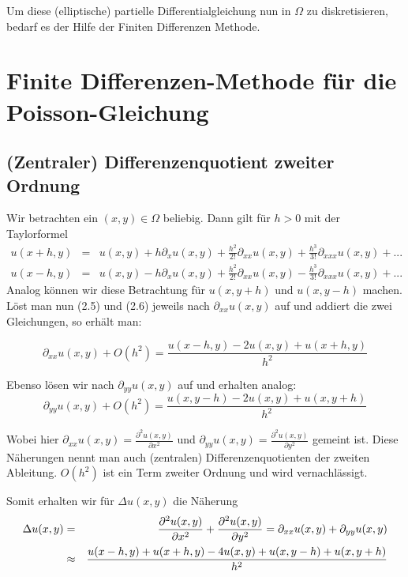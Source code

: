 Um diese (elliptische) partielle Differentialgleichung nun in $\Omega$ zu diskretisieren, bedarf es der Hilfe der Finiten Differenzen Methode.

\section{Finite Differenzen-Methode für die Poisson-Gleichung}\label{s.Finite Differenzen}

\subsection{(Zentraler) Differenzenquotient zweiter Ordnung}\label{ss.Differenzenquotient zweiter Ordnung}

Wir betrachten ein $(x,y) \in \Omega$ beliebig. Dann gilt für $h > 0$ mit der Taylorformel
\begin{eqnarray}
u(x+h,y) &=& u(x,y) + h \partial_{x} u(x,y) + \frac {h^{2}} {2!} \partial_{xx} u(x,y) + \frac {h^{3}} {3!} \partial_{xxx} u(x,y) + ... \\
u(x-h,y) &=& u(x,y) - h \partial_{x} u(x,y) + \frac {h^{2}} {2!} \partial_{xx} u(x,y) - \frac {h^{3}} {3!} \partial_{xxx} u(x,y) + ...
\end{eqnarray}
Analog können wir diese Betrachtung für $u(x,y+h)$ und $u(x,y-h)$ machen. \\
Löst man nun (2.5) und (2.6) jeweils nach $\partial_{xx} u(x,y)$ auf und addiert die zwei Gleichungen, so erhält man:

\begin{equation}
\partial_{xx} u(x,y) + O(h^{2}) = \frac {u(x-h,y) - 2u(x,y) + u(x+h,y)} {h^{2}}
\end{equation}

Ebenso lösen wir nach $\partial_{yy} u(x,y)$ auf und erhalten analog:
\begin{equation}
\partial_{yy} u(x,y) + O(h^{2}) = \frac {u(x,y-h) - 2u(x,y) + u(x,y+h)} {h^{2}}
\end{equation}

Wobei hier $\partial_{xx} u(x,y) = \frac {\partial^{2} u(x,y)} {\partial x^{2}}$ und $\partial_{yy} u(x,y) = \frac {\partial^{2} u(x,y)} {\partial y^{2}}$ gemeint ist.
Diese Näherungen nennt man auch (zentralen) Differenzenquotienten der zweiten Ableitung. $O(h^{2})$ ist ein Term zweiter Ordnung und wird vernachlässigt.

Somit erhalten wir für $\Delta u(x,y)$ die Näherung
\begin{eqnarray}
\Delta u(x,y) &=& \frac {\partial^{2} u(x,y)} {\partial x^{2}} + \frac {\partial^{2} u(x,y)} {\partial y^{2}} = \partial_{xx} u(x,y) + \partial_{yy} u(x,y) \notag \\
&\approx& \frac {u(x-h,y) + u(x+h,y) - 4u(x,y) + u(x,y-h) + u(x,y+h)} {h^{2}}
\end{eqnarray}

